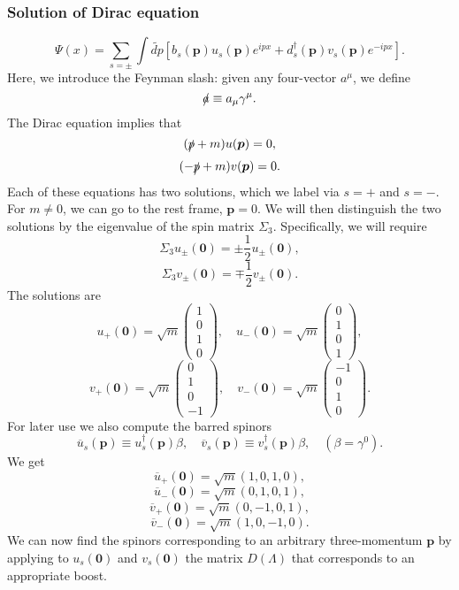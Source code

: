\subsubsection{Solution of Dirac equation}
\[\Psi(x) = \sum_{s = \pm} \int \widetilde{dp} \left[ b_s(\bm{p})u_s(\bm{p}) e^{ipx} + d^{\dagger}_s(\bm{p})v_s(\bm{p}) e^{-ipx}\right].\]
Here, we introduce the Feynman slash: given any four-vector $a^{\mu}$, we define
\[\slashed{a} \equiv a_{\mu} \gamma^{\mu}.\]
The Dirac equation implies that
\[(\slashed{p}+m)u(\bm{p}) = 0,\]
\[(-\slashed{p}+m)v(\bm{p}) = 0.\]
Each of these equations has two solutions, which we label via $s=+$ and $s=-$. For $m \neq 0$, we can go to the rest frame, $\bm{p} = 0$. We will then distinguish the two solutions by the eigenvalue of the spin matrix $\Sigma_3$. Specifically, we will require
\[\Sigma_3 u_{\pm}(\bm{0}) = \pm \frac{1}{2} u_{\pm}(\bm{0}),\]
\[\Sigma_3 v_{\pm}(\bm{0}) = \mp \frac{1}{2} v_{\pm}(\bm{0}).\]
The solutions are
\[u_{+}(\bm{0}) = \sqrt{m} \left( \begin{matrix} 1\\ 0\\ 1 \\ 0\end{matrix} \right) , \quad u_{-}(\bm{0}) = \sqrt{m} \left( \begin{matrix} 0\\ 1\\ 0 \\ 1\end{matrix} \right) ,\]
\[v_{+}(\bm{0}) = \sqrt{m} \left( \begin{matrix} 0\\ 1\\ 0 \\ -1\end{matrix} \right) , \quad v_{-}(\bm{0}) = \sqrt{m} \left( \begin{matrix} -1\\ 0\\ 1 \\ 0\end{matrix} \right) .\]
For later use we also compute the barred spinors
\[\overline{u}_s(\bm{p}) \equiv u^{\dagger}_s(\bm{p})\beta , \quad \overline{v}_s(\bm{p}) \equiv v^{\dagger}_s(\bm{p})\beta , \quad (\beta = \gamma^0).\]
We get
\[\overline{u}_{+}(\bm{0}) = \sqrt{m} (1,0,1,0),\]
\[\overline{u}_{-}(\bm{0}) = \sqrt{m} (0,1,0,1),\]
\[\overline{v}_{+}(\bm{0}) = \sqrt{m} (0,-1,0,1),\]
\[\overline{v}_{-}(\bm{0}) = \sqrt{m} (1,0,-1,0).\]
We can now find the spinors corresponding to an arbitrary three-momentum $\bm{p}$ by applying to $u_s(\bm{0})$ and $v_s(\bm{0})$ the matrix $D(\Lambda)$ that corresponds to an appropriate boost. 
